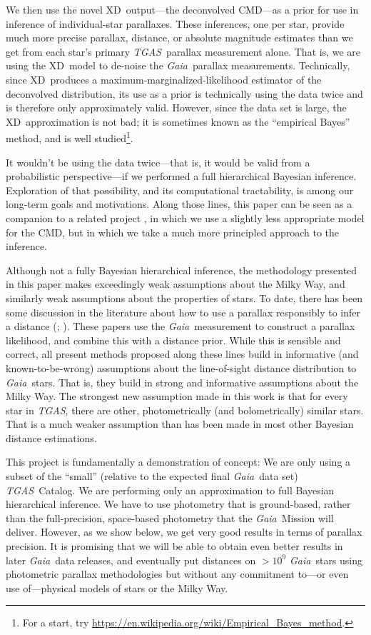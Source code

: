 \documentclass[modern]{aastex61}
\newcommand{\acronym}[1]{{\small{#1}}}
\newcommand{\project}[1]{\textsl{#1}}
\newcommand{\tgas}{\project{\acronym{TGAS}}}
\newcommand{\gaia}{\project{Gaia}}
\newcommand{\xd}{\acronym{XD}}
\newcommand{\cmd}{\acronym{CMD}}
\begin{document}
We then use the novel \xd\ output---the deconvolved \cmd---as
a prior for use in inference of individual-star parallaxes.
These inferences, one per star, provide much more precise parallax, distance,
or absolute magnitude estimates than we get from each star's primary
\tgas\ parallax measurement alone.
That is, we are using the \xd\ model to de-noise the \gaia\ parallax
measurements.
Technically, since \xd\ produces a maximum-marginalized-likelihood estimator
of the deconvolved distribution,
its use as a prior is technically using the data twice and is therefore only approximately valid.
However, since the data set is large, the \xd\ approximation is not bad; it is
sometimes known as the ``empirical Bayes'' method, and is well studied\footnote{For a start, try \url{https://en.wikipedia.org/wiki/Empirical_Bayes_method}.}.

It wouldn't be using the data twice---that is, it would be valid from a
probabilistic perspective---if we performed a full hierarchical Bayesian
inference.
Exploration of that possibility, and its computational tractability,
is among our long-term goals and motivations.
Along those lines, this paper can be seen as a companion to a related
project \citep{leistedtHogg2017}, in which we use a slightly less appropriate
model for the \cmd, but in which we take a much more principled
approach to the inference.

Although not a fully Bayesian hierarchical inference, the methodology presented in this paper makes exceedingly weak assumptions
about the Milky Way, and similarly weak assumptions about the properties of
stars.
To date, there has been some discussion in the literature
about how to use a parallax responsibly to infer a distance (\citealt{astraatmadja16a}; \citealt{astraatmadja16b}).
These papers use the \gaia\ measurement to construct a parallax likelihood,
and combine this with a distance prior.
While this is sensible and correct, all present methods proposed along
these lines build in informative (and known-to-be-wrong) assumptions
about the line-of-sight distance distribution to \gaia\ stars.
That is, they build in strong and informative assumptions about the Milky
Way.
The strongest new assumption made in this work is that for every star
in \tgas, there are other, photometrically (and bolometrically)
similar stars.
That is a much weaker assumption than has been made in most other Bayesian
distance estimations.

This project is fundamentally a demonstration of concept:
We are only using a subset of the ``small'' (relative to the expected final \gaia\ data set)
\tgas\ Catalog.
We are performing only an approximation to full Bayesian hierarchical inference.
We have to use photometry that is ground-based, rather than the full-precision,
space-based photometry that the \gaia\ Mission will deliver.
However, as we show below, we get very good results in terms of parallax precision.
It is promising that we will be able to obtain even better results
in later \gaia\ data releases, and eventually put distances on $>10^9$
\gaia\ stars using photometric parallax methodologies but without any
commitment to---or even use of---physical models of stars or the Milky Way.
\end{document}
